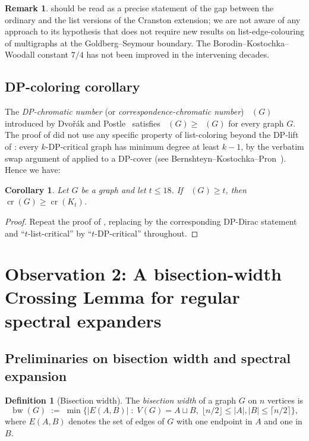 \documentclass[11pt,a4paper]{article}
\newtheorem{corollary}[theorem]{Corollary}
\theoremstyle{definition}
\newtheorem{remark}[theorem]{Remark}
\newtheorem{definition}[theorem]{Definition}
\DeclareMathOperator{\crN}{cr}
\DeclareMathOperator{\chl}{\chi_{\ell}}
\DeclareMathOperator{\chDP}{\chi_{\mathrm{DP}}}
\DeclareMathOperator{\bw}{bw}
\begin{document}
\begin{remark}
 should be read as a precise statement of
the gap between the ordinary and the list versions of the
Cranston extension; we are not aware of any approach to its
hypothesis that does not require new results on
list-edge-colouring of multigraphs at the Goldberg--Seymour
boundary. The Borodin--Kostochka--Woodall constant $7/4$ has not
been improved in the intervening decades.
\end{remark}

\subsection{DP-coloring corollary}\label{ssec:dp}

The \emph{DP-chromatic number} (or \emph{correspondence-chromatic
number}) $\chDP(G)$ introduced by Dvo\v{r}\'ak and
Postle~\cite{DP} satisfies $\chDP(G) \ge \chl(G)$ for every graph
$G$. The proof of  did not use any specific
property of list-coloring beyond the DP-lift of
: every $k$-DP-critical graph has minimum
degree at least $k - 1$, by the verbatim swap argument of
 applied to a DP-cover (see
Bernshteyn--Kostochka--Pron~\cite{BKP}). Hence we have:

\begin{corollary}\label{cor:dp}
Let $G$ be a graph and let $t \le 18$. If $\chDP(G) \ge t$, then
$\crN(G) \ge \crN(K_t)$.
\end{corollary}

\begin{proof}
Repeat the proof of , replacing
 by the corresponding DP-Dirac statement and
``$t$-list-critical'' by ``$t$-DP-critical'' throughout.
\end{proof}

\section{Observation 2: A bisection-width Crossing Lemma for
         regular spectral expanders}\label{sec:expander-crossing}

\subsection{Preliminaries on bisection width and spectral
            expansion}\label{ssec:prelim-spec}

\begin{definition}[Bisection width]\label{def:bw}
The \emph{bisection width} of a graph $G$ on $n$ vertices is
\[
   \bw(G) \;:=\; \min \bigl\{ |E(A, B)| \;:\;
     V(G) = A \sqcup B,\; \lfloor n/2 \rfloor \le |A|, |B|
     \le \lceil n/2 \rceil \bigr\},
\]
where $E(A, B)$ denotes the set of edges of $G$ with one endpoint
in $A$ and one in $B$.
\end{definition}
\end{document}
